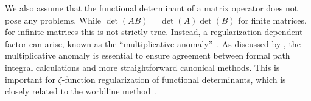 We also assume that the functional determinant of a matrix operator does not pose any problems.  
While $\det(AB)=\det(A)\det(B)$ for finite matrices, for infinite matrices this is not strictly true. 
Instead, a regularization-dependent factor can arise, known as the ``multiplicative anomaly''~\citep{Elizalde1998}.
As discussed by \citet{McKenzieSmith1998}, 
the multiplicative anomaly is essential to ensure agreement between 
formal path integral calculations and more straightforward canonical methods.  
This is important for $\zeta$-function regularization of functional determinants, 
which is closely related to the worldline method~\citep{Elizalde2008}.

